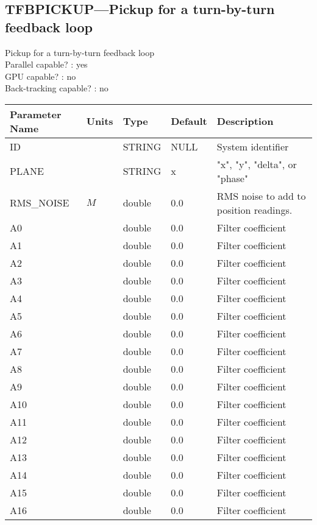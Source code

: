 \subsection{TFBPICKUP---Pickup for a turn-by-turn feedback loop}
Pickup for a turn-by-turn feedback loop
\\
Parallel capable? : yes\\
GPU capable? : no\\
Back-tracking capable? : no\\
\begin{tabular}{|l|l|l|l|p{\descwidth}|} \hline
Parameter Name & Units & Type & Default & Description \\ \hline 
ID &  & STRING &   NULL            & System identifier  \\ \hline 
PLANE &  & STRING &   x               & "x", "y", "delta", or "phase"  \\ \hline 
RMS\_NOISE & $M$ & double &  0.0 & RMS noise to add to position readings.  \\ \hline 
A0 &  & double &  0.0 & Filter coefficient  \\ \hline 
A1 &  & double &  0.0 & Filter coefficient  \\ \hline 
A2 &  & double &  0.0 & Filter coefficient  \\ \hline 
A3 &  & double &  0.0 & Filter coefficient  \\ \hline 
A4 &  & double &  0.0 & Filter coefficient  \\ \hline 
A5 &  & double &  0.0 & Filter coefficient  \\ \hline 
A6 &  & double &  0.0 & Filter coefficient  \\ \hline 
A7 &  & double &  0.0 & Filter coefficient  \\ \hline 
A8 &  & double &  0.0 & Filter coefficient  \\ \hline 
A9 &  & double &  0.0 & Filter coefficient  \\ \hline 
A10 &  & double &  0.0 & Filter coefficient  \\ \hline 
A11 &  & double &  0.0 & Filter coefficient  \\ \hline 
A12 &  & double &  0.0 & Filter coefficient  \\ \hline 
A13 &  & double &  0.0 & Filter coefficient  \\ \hline 
A14 &  & double &  0.0 & Filter coefficient  \\ \hline 
A15 &  & double &  0.0 & Filter coefficient  \\ \hline 
A16 &  & double &  0.0 & Filter coefficient  \\ \hline 

\end{tabular}
